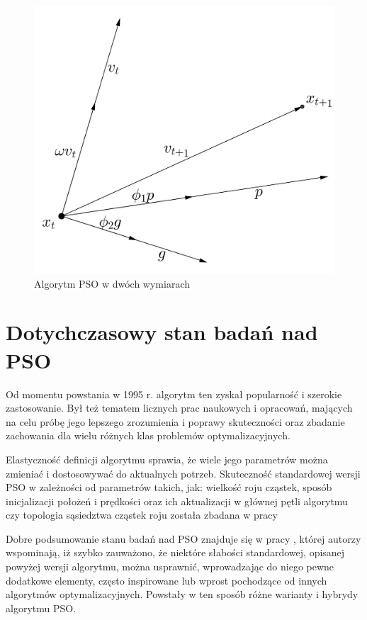 \documentclass[12pt, twoside, openany, abstract=on]{report}
\theoremstyle{definition}
\begin{document}
\begin{figure}[H]
    \centering
 \includegraphics[scale=0.2]{PSO2D.png}
 \caption{Algorytm PSO w dwóch wymiarach}
\end{figure}

\section{Dotychczasowy stan badań nad PSO}

Od momentu powstania w 1995 r. algorytm ten zyskał popularność i szerokie zastosowanie. Był też tematem licznych prac naukowych i opracowań, mających na celu próbę jego lepszego zrozumienia i poprawy skuteczności oraz zbadanie zachowania dla wielu różnych klas problemów optymalizacyjnych.

Elastyczność definicji algorytmu sprawia, że wiele jego parametrów 
można zmieniać i dostosowywać do aktualnych potrzeb. Skuteczność standardowej wersji PSO 
w zależności od parametrów takich, jak: wielkość roju cząstek, sposób inicjalizacji położeń i prędkości oraz ich aktualizacji w głównej pętli algorytmu czy topologia sąsiedztwa cząstek roju została zbadana w pracy \cite{SPso} 

Dobre podsumowanie stanu badań nad PSO znajduje się w pracy \cite{ComprLearnPso}, której autorzy wspominają, iż szybko zauważono, że niektóre słabości standardowej, opisanej powyżej wersji algorytmu, można usprawnić, wprowadzając do niego pewne dodatkowe elementy, często inspirowane lub wprost pochodzące od innych algorytmów optymalizacyjnych. Powstały w ten sposób różne warianty i hybrydy algorytmu PSO.
\end{document}
